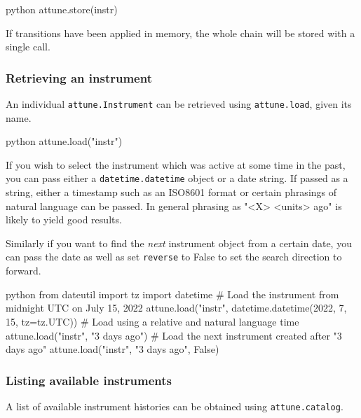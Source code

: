 \begin{codefragment}{python}
attune.store(instr)
\end{codefragment}

If transitions have been applied in memory, the whole chain will be
stored with a single call.

\hypertarget{retrieving-an-instrument}{%
\subsubsection{Retrieving an instrument}\label{retrieving-an-instrument}}

An individual \texttt{attune.Instrument} can be
retrieved using \texttt{attune.load}, given its name.

\begin{codefragment}{python}
attune.load("instr")
\end{codefragment}

If you wish to select the instrument which was active at some time in
the past, you can pass either a
\texttt{datetime.datetime} object or a date string. If
passed as a string, either a timestamp such as an ISO8601 format or
certain phrasings of natural language can be passed. In general phrasing
as "\textless X\textgreater{} \textless units\textgreater{} ago" is
likely to yield good results.

Similarly if you want to find the \emph{next} instrument object from a
certain date, you can pass the date as well as set \texttt{reverse} to
False to set the search direction to forward.

\begin{codefragment}{python}
from dateutil import tz
import datetime
# Load the instrument from midnight UTC on July 15, 2022
attune.load("instr", datetime.datetime(2022, 7, 15, tz=tz.UTC))
# Load using a relative and natural language time
attune.load("instr", "3 days ago")
# Load the next instrument created after "3 days ago"
attune.load("instr", "3 days ago", False)
\end{codefragment}

\hypertarget{listing-available-instruments}{%
\subsubsection{Listing available
instruments}\label{listing-available-instruments}}

A list of available instrument histories can be obtained using
\texttt{attune.catalog}.

